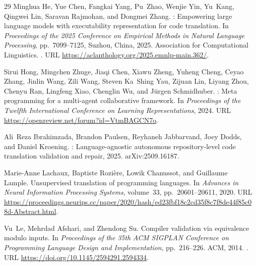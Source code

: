 \documentclass{article}
\begin{document}
\begin{thebibliography}{29}
Minghua He, Yue Chen, Fangkai Yang, Pu~Zhao, Wenjie Yin, Yu~Kang, Qingwei Lin,
  Saravan Rajmohan, and Dongmei Zhang.
: Empowering large language models with executability
  representation for code translation.
\newblock In \emph{Proceedings of the 2025 Conference on Empirical Methods in
  Natural Language Processing}, pp.\  7099--7125, Suzhou, China, 2025.
  Association for Computational Linguistics.
\newblock {}.
\newblock URL \url{https://aclanthology.org/2025.emnlp-main.362/}.

Sirui Hong, Mingchen Zhuge, Jiaqi Chen, Xiawu Zheng, Yuheng Cheng, Ceyao Zhang,
  Jinlin Wang, Zili Wang, Steven Ka~Shing Yau, Zijuan Lin, Liyang Zhou, Chenyu
  Ran, Lingfeng Xiao, Chenglin Wu, and J{\"u}rgen Schmidhuber.
: Meta programming for a multi-agent collaborative
  framework.
\newblock In \emph{Proceedings of the Twelfth International Conference on
  Learning Representations}, 2024.
\newblock URL \url{https://openreview.net/forum?id=VtmBAGCN7o}.

Ali~Reza Ibrahimzada, Brandon Paulsen, Reyhaneh Jabbarvand, Joey Dodds, and
  Daniel Kroening.
: Language-agnostic autonomous repository-level code
  translation validation and repair, 2025.
\newblock arXiv:2509.16187.

Marie-Anne Lachaux, Baptiste Rozi{\`e}re, Lowik Chanussot, and Guillaume
  Lample.
\newblock Unsupervised translation of programming languages.
\newblock In \emph{Advances in Neural Information Processing Systems},
  volume~33, pp.\  20601--20611, 2020.
\newblock URL
  \url{https://proceedings.neurips.cc/paper/2020/hash/ed23fbf18c2cd35f8c7f8de44f85c08d-Abstract.html}.

Vu~Le, Mehrdad Afshari, and Zhendong Su.
\newblock Compiler validation via equivalence modulo inputs.
\newblock In \emph{Proceedings of the 35th ACM SIGPLAN Conference on
  Programming Language Design and Implementation}, pp.\  216--226. ACM, 2014.
\newblock {}.
\newblock URL \url{https://doi.org/10.1145/2594291.2594334}.


\end{thebibliography}
\end{document}
